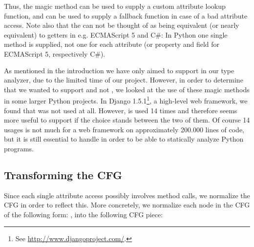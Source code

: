 Thus, the magic method  can be used to supply a custom attribute lookup function, and  can be used to supply a fallback function in case of a bad attribute access. Note also that the  can not be thought of as being equivalent (or nearly equivalent) to getters in e.g. ECMAScript 5 and C\#: In Python one single method is supplied, not one for each attribute (or property and field for ECMAScript 5, respectively C\#).

As mentioned in the introduction we have only aimed to support  in our type analyzer, due to the limited time of our project. However, in order to determine that we wanted to support  and not , we looked at the use of these magic methods in some larger Python projects. In Django 1.5.1\footnote{See \url{http://www.djangoproject.com/}.}, a high-level web framework, we found that  was not used at all. However,  is used 14 times and therefore seems more useful to support if the choice stands between the two of them. Of course 14 usages is not much for a web framework on approximately 200.000 lines of code, but it is still essential to handle in order to be able to statically analyze Python programs.

\subsection{Transforming the CFG}
Since each single attribute access possibly involves method calls, we normalize the CFG in order to reflect this. More concretely, we normalize each node in the CFG of the following form: , into the following CFG piece:

